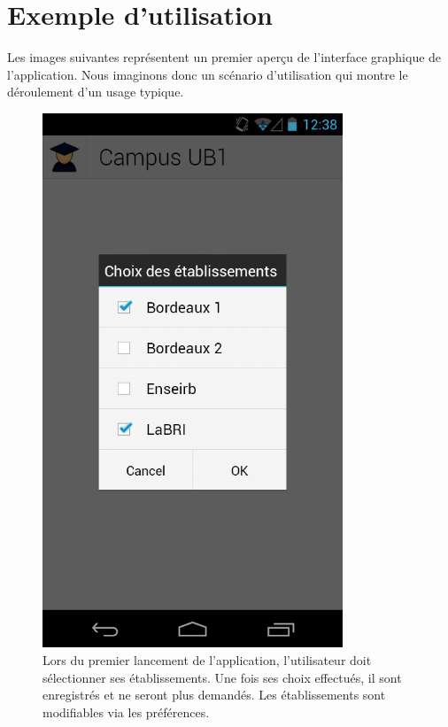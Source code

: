 \documentclass [pdftex,12pt] {report}
\begin{document}
\chapter{Exemple d'utilisation}

Les images suivantes représentent un premier aperçu de l'interface graphique de l'application. Nous imaginons donc un scénario d'utilisation qui montre le déroulement d'un usage typique.

\begin{figure}
  \begin{minipage}[t]{8cm}
    \centering
    \includegraphics[width=0.8\textwidth]{resources/ui_preview/01}
    \caption{Lors du premier lancement de l'application, l'utilisateur doit sélectionner ses établissements. Une fois ses choix effectués, il sont enregistrés et ne seront plus demandés. Les établissements sont modifiables via les préférences.}

\end{minipage}
\end{figure}
\end{document}
